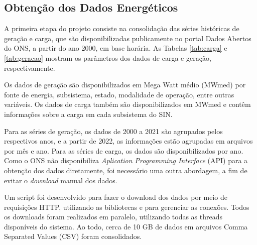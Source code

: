\subsection{Obtenção dos Dados Energéticos} %

A primeira etapa do projeto consiste na consolidação das séries históricas de geração e carga,
que são disponibilizadas publicamente no portal Dados Abertos do ONS, a partir do ano 2000, em 
base horária. As Tabelas \ref{tab:carga} e \ref{tab:geracao} mostram os parâmetros dos dados de carga e geração, respectivamente.

Os dados de geração são disponibilizados em Mega Watt médio (MWmed) por fonte de energia, subsistema, estado, 
modalidade de operação, entre outras variáveis. Os dados de carga também são disponibilizados em MWmed e contêm 
informações sobre a carga em cada subsistema do SIN.

Para as séries de geração, os dados de 2000 a 2021 são agrupados pelos respectivos anos, e a partir de 2022,
as informações estão agrupadas em arquivos por mês e ano. Para as séries de carga, os dados são disponibilizados por
ano. Como o ONS não disponibiliza \textit{Aplication Programming Interface} (API) para a obtenção dos dados diretamente, foi 
necessário uma outra abordagem, a fim de evitar o \textit{download} manual dos dados. 

\begin{table}[htb]
  \centering
\end{table}

Um script foi desenvolvido para fazer o download dos dados por meio de requisições HTTP, utilizando as bibliotecas 
 e  para gerenciar as conexões. Todos os downloads foram realizados em paralelo, utilizando 
todas as threads disponíveis do sistema. Ao todo, cerca de 10 GB de dados em arquivos Comma Separated Values (CSV) foram consolidados.

